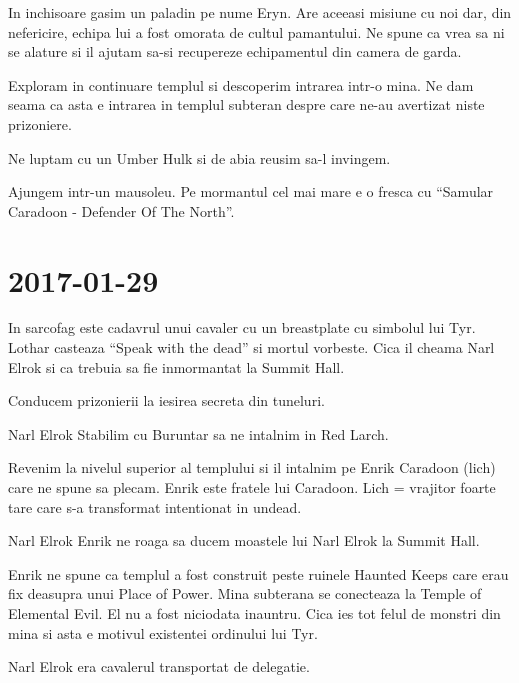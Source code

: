 \documentclass[12pt,oneside]{book}
\begin{document}
In inchisoare gasim un paladin pe nume Eryn. Are aceeasi misiune cu noi dar, din nefericire, echipa lui a fost
omorata de cultul pamantului. Ne spune ca vrea sa ni se alature si il ajutam sa-si recupereze echipamentul din camera de garda.

Exploram in continuare templul si descoperim intrarea intr-o mina. Ne dam seama ca asta e intrarea in templul subteran despre
care ne-au avertizat niste prizoniere.

Ne luptam cu un Umber Hulk si de abia reusim sa-l invingem.

Ajungem intr-un mausoleu. Pe mormantul cel mai mare e o fresca cu ``Samular Caradoon - Defender Of The North''.


\section{2017-01-29}

In sarcofag este cadavrul unui cavaler cu un breastplate cu simbolul lui Tyr. Lothar casteaza ``Speak with the dead'' si
mortul vorbeste. Cica il cheama Narl Elrok si ca trebuia sa fie inmormantat la Summit Hall.

Conducem prizonierii la iesirea secreta din tuneluri.

\begin{rpg-paperbox}{Narl Elrok}
Stabilim cu Buruntar sa ne intalnim in Red Larch.
\end{rpg-paperbox}

Revenim la nivelul superior al templului si il intalnim pe Enrik Caradoon (lich) care ne spune sa plecam. Enrik este fratele
lui Caradoon. Lich = vrajitor foarte tare care s-a transformat intentionat in undead.

\begin{rpg-paperbox}{Narl Elrok}
	Enrik ne roaga sa ducem moastele lui Narl Elrok la Summit Hall.
\end{rpg-paperbox}

Enrik ne spune ca templul a fost construit peste ruinele Haunted Keeps care erau fix deasupra unui Place of Power. Mina subterana se conecteaza  la Temple 
of Elemental Evil. El nu  a fost niciodata inauntru. Cica ies tot felul de monstri din mina si asta e motivul existentei ordinului lui Tyr.

Narl Elrok era cavalerul transportat de delegatie.
\end{document}
